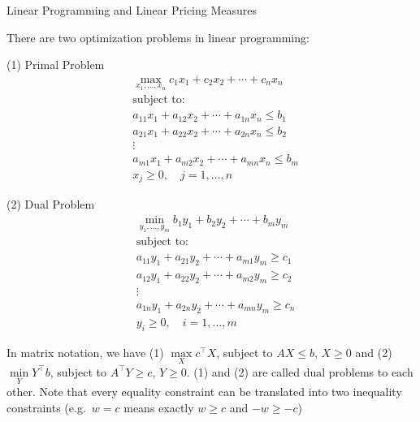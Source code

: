 \documentclass{beamer}
\begin{document}
\begin{frame}{Linear Programming and Linear Pricing Measures}

    {\footnotesize \footnotesize
     There are two optimization problems in linear programming:

    \begin{multicols}{2}
\noindent
(1) Primal Problem
\[
\begin{aligned}
&\max_{x_1,\ldots,x_n} c_1 x_1 + c_2 x_2 + \cdots + c_n x_n \\
&\text{subject to: } \\
&a_{11} x_1 + a_{12} x_2 + \cdots + a_{1n} x_n \leq b_1 \\
&a_{21} x_1 + a_{22} x_2 + \cdots + a_{2n} x_n \leq b_2 \\
&\vdots \\
&a_{m1} x_1 + a_{m2} x_2 + \cdots + a_{mn} x_n \leq b_m \\
&x_j \geq 0, \quad j = 1, \ldots, n
\end{aligned}
\]


\noindent
(2) Dual Problem
\[
\begin{aligned}
&\min_{y_1,\ldots,y_m} b_1 y_1 + b_2 y_2 + \cdots + b_m y_m \\
&\text{subject to: } \\
&a_{11} y_1 + a_{21} y_2 + \cdots + a_{m1} y_m \geq c_1 \\
&a_{12} y_1 + a_{22} y_2 + \cdots + a_{m2} y_m \geq c_2 \\
&\vdots \\
&a_{1n} y_1 + a_{2n} y_2 + \cdots + a_{mn} y_m \geq c_n \\
&y_i \geq 0, \quad i = 1, \ldots, m
\end{aligned}
\]
\end{multicols}
In matrix notation, we have (1) $\max\limits_X c^\top X$, subject to $AX \leq b$, $X \geq 0$ 
and (2) $\min\limits_Y Y^\top b$, subject to $A^\top Y \geq c$, $Y \geq 0$. (1) and (2) 
are called dual problems to each other. Note that every equality constraint can be translated into two 
inequality constraints (e.g.\ $w = c$ means exactly $w \geq c$ and $-w \geq -c$)

    }
\end{frame}
\end{document}
